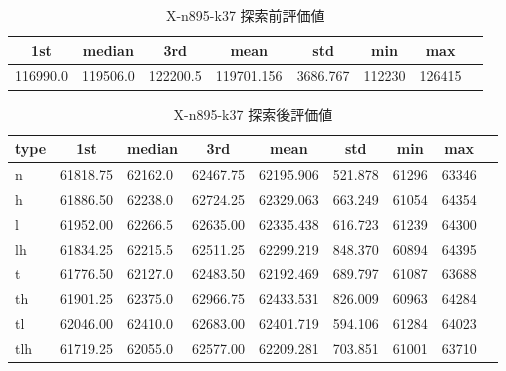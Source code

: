 \begin{table}[htbp]
    \caption{X-n895-k37 探索前評価値}
    \begin{tabular}{|l|l|l|l|l|l|l|l|}\hline
    \multicolumn{1}{|c|}{\textbf{1st}}
    &\multicolumn{1}{c|}{\textbf{median}}
    &\multicolumn{1}{c|}{\textbf{3rd}}
    &\multicolumn{1}{c|}{\textbf{mean}}
    &\multicolumn{1}{c|}{\textbf{std}}
    &\multicolumn{1}{c|}{\textbf{min}}
    &\multicolumn{1}{c|}{\textbf{max}}\\\hline
	116990.0 & 119506.0 & 122200.5 & 119701.156 & 3686.767 & 112230 & 126415\\\hline
	\end{tabular}
\end{table}
\begin{table}[htbp]
    \caption{X-n895-k37 探索後評価値}
    \begin{tabular}{|l|l|l|l|l|l|l|l|l|}\hline
    \multicolumn{1}{|c|}{\textbf{type}}
    &\multicolumn{1}{|c|}{\textbf{1st}}
    &\multicolumn{1}{c|}{\textbf{median}}
    &\multicolumn{1}{c|}{\textbf{3rd}}
    &\multicolumn{1}{c|}{\textbf{mean}}
    &\multicolumn{1}{c|}{\textbf{std}}
    &\multicolumn{1}{c|}{\textbf{min}}
    &\multicolumn{1}{c|}{\textbf{max}}\\\hline
	n & 61818.75 & 62162.0 & 62467.75 & 62195.906 & 521.878 & 61296 & 63346\\\hline
	h & 61886.50 & 62238.0 & 62724.25 & 62329.063 & 663.249 & 61054 & 64354\\\hline
	l & 61952.00 & 62266.5 & 62635.00 & 62335.438 & 616.723 & 61239 & 64300\\\hline
	lh & 61834.25 & 62215.5 & 62511.25 & 62299.219 & 848.370 & 60894 & 64395\\\hline
	t & 61776.50 & 62127.0 & 62483.50 & 62192.469 & 689.797 & 61087 & 63688\\\hline
	th & 61901.25 & 62375.0 & 62966.75 & 62433.531 & 826.009 & 60963 & 64284\\\hline
	tl & 62046.00 & 62410.0 & 62683.00 & 62401.719 & 594.106 & 61284 & 64023\\\hline
	tlh & 61719.25 & 62055.0 & 62577.00 & 62209.281 & 703.851 & 61001 & 63710\\\hline
	\end{tabular}
\end{table}

